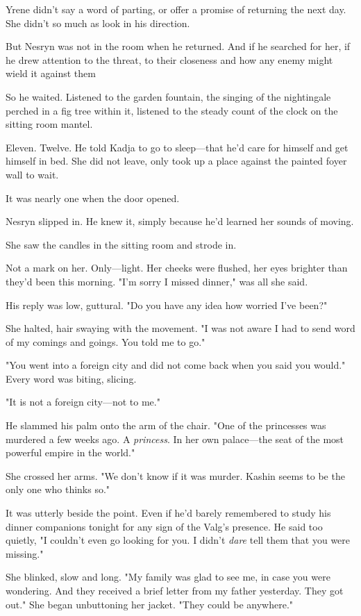 Yrene didn't say a word of parting, or offer a promise of returning the next day. She didn't so much as look in his direction.

But Nesryn was not in the room when he returned. And if he searched for her, if he drew attention to the threat, to their closeness and how any enemy might wield it against them 

So he waited. Listened to the garden fountain, the singing of the nightingale perched in a fig tree within it, listened to the steady count of the clock on the sitting room mantel.

Eleven. Twelve. He told Kadja to go to sleep---that he'd care for himself and get himself in bed. She did not leave, only took up a place against the painted foyer wall to wait.

It was nearly one when the door opened.

Nesryn slipped in. He knew it, simply because he'd learned her sounds of moving.

She saw the candles in the sitting room and strode in.

Not a mark on her. Only---light. Her cheeks were flushed, her eyes brighter than they'd been this morning. "I'm sorry I missed dinner," was all she said.

His reply was low, guttural. "Do you have any idea how worried I've been?"

She halted, hair swaying with the movement. "I was not aware I had to send word of my comings and goings. You told me to go."

"You went into a foreign city and did not come back when you said you would." Every word was biting, slicing.

"It is not a foreign city---not to me."

He slammed his palm onto the arm of the chair. "One of the princesses was murdered a few weeks ago. A \emph{princess}. In her own palace---the seat of the most powerful empire in the world."

She crossed her arms. "We don't know if it was murder. Kashin seems to be the only one who thinks so."

It was utterly beside the point. Even if he'd barely remembered to study his dinner companions tonight for any sign of the Valg's presence. He said too quietly, "I couldn't even go looking for you. I didn't \emph{dare} tell them that you were missing."

She blinked, slow and long. "My family was glad to see me, in case you were wondering. And they received a brief letter from my father yesterday. They got out." She began unbuttoning her jacket. "They could be anywhere."

